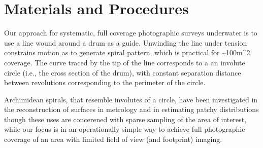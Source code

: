 \section{Materials and Procedures}

Our approach for systematic, full coverage photographic surveys underwater is to use a line wound around a drum as a guide. Unwinding the line under tension constrains motion as to generate spiral pattern, which is practical for \sim{100m^{2}} coverage. The curve traced by the tip of the line corresponds to a an involute circle (i.e., the cross section of the drum), with constant separation distance between revolutions corresponding to the perimeter of the circle.

Archimidean spirals, that resemble involutes of a circle, have been investigated in the reconstruction of surfaces in metrology \cite{Wieczorowski_2001} and in estimating patchy distributions \cite{Kalikhman_2006} though these uses are concerened with sparse sampling of the area of interest, while our focus is in an operationally simple way to achieve full photographic coverage of an area with limited field of view (and footprint) imaging.

